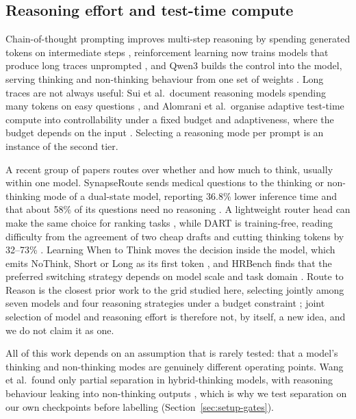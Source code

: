 \subsection{Reasoning effort and test-time compute}
\label{sec:related-reasoning}

Chain-of-thought prompting improves multi-step reasoning by spending
generated tokens on intermediate steps \cite{wei2022cot}, reinforcement
learning now trains models that produce long traces unprompted
\cite{deepseek2025r1}, and Qwen3 builds the control into the model, serving
thinking and non-thinking behaviour from one set of weights \cite{qwen3}.
Long traces are not always useful: Sui
et al.\ document reasoning models spending many tokens on easy questions
\cite{sui2025stopoverthinking}, and Alomrani et al.\ organise adaptive
test-time compute into controllability under a fixed budget and adaptiveness,
where the budget depends on the input \cite{alomrani2025reasoningbudget}.
Selecting a reasoning mode per prompt is an instance of the second tier.

A recent group of papers routes over whether and how much to think, usually
within one model. SynapseRoute sends medical questions to the thinking or
non-thinking mode of a dual-state model, reporting 36.8\% lower inference
time and that about 58\% of its questions need no reasoning
\cite{zhang2025synapseroute}. A lightweight router head can make the same
choice for ranking tasks \cite{guo2026thinkwhenneeded}, while DART is
training-free, reading difficulty from the agreement of two cheap drafts and
cutting thinking tokens by 32--73\% \cite{lee2026dart}. Learning
When to Think moves the decision inside the model, which emits NoThink, Short
or Long as its first token \cite{kassenaar2026learningwhentothink}, and
HRBench finds that the preferred switching strategy depends on model scale
and task domain \cite{ning2026hrbench}. Route to Reason is the closest prior
work to the grid studied here, selecting jointly among seven models and four
reasoning strategies under a budget constraint \cite{pan2026routetoreason};
joint selection of model and reasoning effort is therefore not, by itself, a
new idea, and we do not claim it as one.

All of this work depends on an assumption that is rarely tested: that a
model's thinking and non-thinking modes are genuinely different operating
points. Wang et al.\ found only partial separation in hybrid-thinking models,
with reasoning behaviour leaking into non-thinking outputs
\cite{wang2025demystifying}, which is why we test separation on our own
checkpoints before labelling (Section~\ref{sec:setup-gates}).

